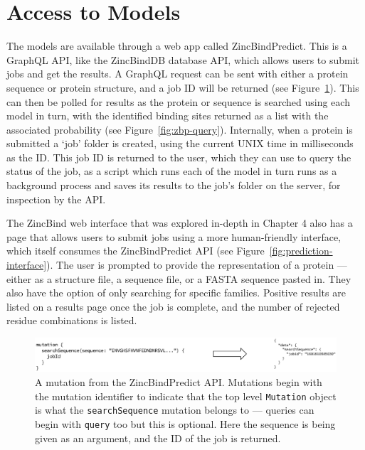 \section{Access to Models}

The models are available through a web app called ZincBindPredict. This is a GraphQL API, like the ZincBindDB database API, which allows users to submit jobs and get the results. A GraphQL request can be sent with either a protein sequence or protein structure, and a job ID will be returned (see Figure~\ref{fig:zbp-mutation}). This can then be polled for results as the protein or sequence is searched using each model in turn, with the identified binding sites returned as a list with the associated probability (see Figure~\ref{fig:zbp-query}). Internally, when a protein is submitted a `job' folder is created, using the current UNIX time in milliseconds as the ID. This job ID is returned to the user, which they can use to query the status of the job, as a script which runs each of the model in turn runs as a background process and saves its results to the job's folder on the server, for inspection by the API.

The ZincBind web interface that was explored in-depth in Chapter 4 also has a page that allows users to submit jobs using a more human-friendly interface, which itself consumes the ZincBindPredict API (see Figure~\ref{fig:prediction-interface}). The user is prompted to provide the representation of a protein --- either as a structure file, a sequence file, or a FASTA sequence pasted in. They also have the option of only searching for specific families. Positive results are listed on a results page once the job is complete, and the number of rejected residue combinations is listed.

\begin{figure}
\centering
\includegraphics[width=1.0\textwidth]{Figures/zbp-mutation.eps}
\caption[ZincBindPredict mutation request.]{\label{fig:zbp-mutation} A mutation from the ZincBindPredict API. Mutations
begin with the mutation identifier to indicate that the top level \texttt{Mutation} object
is what the \texttt{searchSequence} mutation belongs to --- queries can begin with
\texttt{query} too but this is optional. Here the sequence is being given as an
argument, and the ID of the job is returned.}
\end{figure}

